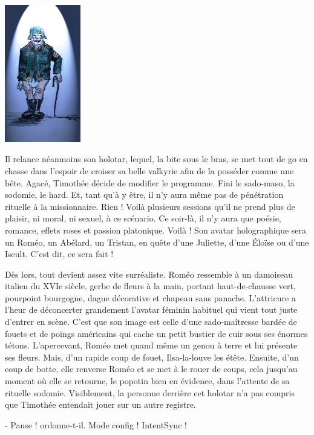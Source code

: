 \begin{floatingfigure}[l]{40mm}
\includegraphics[height=60mm]{corps/chapitre6/img/personnage-avatar.jpg}
\end{floatingfigure}

Il relance néanmoins son holotar, lequel, la bite sous le bras, se met tout de go en chasse dans l’espoir de croiser sa belle valkyrie afin de la posséder comme une bête. Agacé, Timothée décide de modifier le programme. Fini le sado-maso, la sodomie, le hard. Et, tant qu’à y être, il n’y aura même pas de pénétration rituelle à la missionnaire. Rien ! Voilà plusieurs sessions qu’il ne prend plus de plaisir, ni moral, ni sexuel, à ce scénario. Ce soir-là, il n’y aura que poésie, romance, effets roses et passion platonique. Voilà ! Son avatar holographique sera un Roméo, un Abélard, un Tristan, en quête d’une Juliette, d’une Éloïse ou d’une Iseult. C’est dit, ce sera fait !

Dès lors, tout devient assez vite surréaliste. Roméo ressemble à un damoiseau italien du XVIe siècle, gerbe de fleurs à la main, portant haut-de-chausse vert, pourpoint bourgogne, dague décorative et chapeau sans panache. L’attricure a l’heur de déconcerter grandement l’avatar féminin habituel qui vient tout juste d’entrer en scène. C’est que son image est celle d’une sado-maîtresse bardée de fouets et de poings américains qui cache un petit bustier de cuir sous ses énormes tétons. L’apercevant, Roméo met quand même un genou à terre et lui présente ses fleurs. Mais, d’un rapide coup de fouet, Ilsa-la-louve les étête. Ensuite, d’un coup de botte, elle renverse Roméo et se met à le rouer de coups, cela jusqu’au moment où elle se retourne, le popotin bien en évidence, dans l’attente de sa rituelle sodomie. Visiblement, la personne derrière cet holotar n’a pas compris que Timothée entendait jouer sur un autre registre.

- Pause ! ordonne-t-il. Mode config ! IntentSync !

